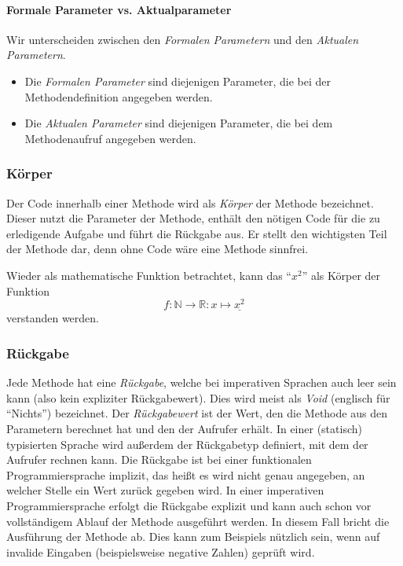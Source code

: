 		\paragraph{Formale Parameter vs. Aktualparameter}
			Wir unterscheiden zwischen den \textit{Formalen Parametern} und den \textit{Aktualen Parametern}.
			
			\begin{itemize}
				\item Die \textit{Formalen Parameter} sind diejenigen Parameter, die bei der Methodendefinition angegeben werden.
				\item Die \textit{Aktualen Parameter} sind diejenigen Parameter, die bei dem Methodenaufruf angegeben werden.
			\end{itemize}
	
	\subsubsection{Körper} \functionalMark \imperativeMark \oopMark
		Der Code innerhalb einer Methode wird als \textit{Körper} der Methode bezeichnet. Dieser nutzt die Parameter der Methode, enthält den nötigen Code für die zu erledigende Aufgabe und führt die Rückgabe aus. Er stellt den wichtigsten Teil der Methode dar, denn ohne Code wäre eine Methode sinnfrei.
		
		Wieder als mathematische Funktion betrachtet, kann das \enquote{\( x ^ 2 \)} als Körper der Funktion \[ f : \mathbb{N} \rightarrow \mathbb{R} : x \mapsto \underline{x ^ 2} \] verstanden werden.
	
	\subsubsection{Rückgabe} \functionalMark \imperativeMark \oopMark
		Jede Methode hat eine \textit{Rückgabe}, welche bei imperativen Sprachen auch leer sein kann (also kein expliziter Rückgabewert). Dies wird meist als \textit{Void} (englisch für \enquote{Nichts}) bezeichnet. Der \textit{Rückgabewert} ist der Wert, den die Methode aus den Parametern berechnet hat und den der Aufrufer erhält. In einer (statisch) typisierten Sprache wird außerdem der Rückgabetyp definiert, mit dem der Aufrufer rechnen kann. Die Rückgabe ist bei einer funktionalen Programmiersprache implizit, das heißt es wird nicht genau angegeben, an welcher Stelle ein Wert zurück gegeben wird. In einer imperativen Programmiersprache erfolgt die Rückgabe explizit und kann auch schon vor vollständigem Ablauf der Methode ausgeführt werden. In diesem Fall bricht die Ausführung der Methode ab. Dies kann zum Beispiels nützlich sein, wenn auf invalide Eingaben (beispielsweise negative Zahlen) geprüft wird.
		
